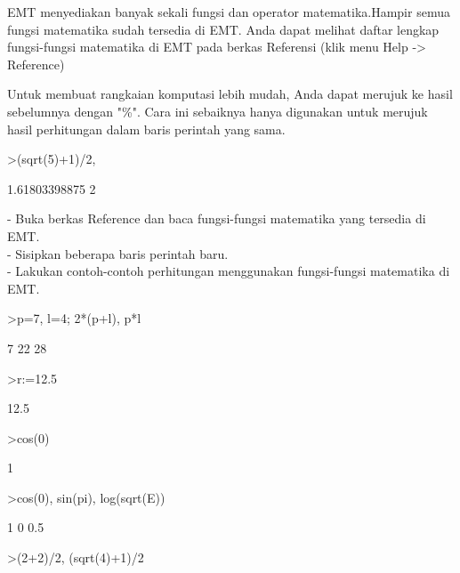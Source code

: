 \documentclass[12pt,arial,letterpaper]{book}
\begin{document}
\begin{eulernootebook}
\begin{eulercomment}
\begin{eulercomment}
\begin{eulercomment}
EMT menyediakan banyak sekali fungsi dan operator matematika.Hampir semua fungsi
matematika sudah tersedia di EMT. Anda dapat melihat daftar lengkap fungsi-fungsi
matematika di EMT pada berkas Referensi (klik menu Help -\textgreater{} Reference)

Untuk membuat rangkaian komputasi lebih mudah, Anda dapat merujuk ke hasil
sebelumnya dengan "\%". Cara ini sebaiknya hanya digunakan untuk merujuk hasil
perhitungan dalam baris perintah yang sama.
\end{eulercomment}
\begin{eulerprompt}
>(sqrt(5)+1)/2, %
\end{eulerprompt}
\begin{euleroutput}
  1.61803398875
  2
\end{euleroutput}
\begin{eulercomment}
- Buka berkas Reference dan baca fungsi-fungsi matematika yang
tersedia di EMT.\\
- Sisipkan beberapa baris perintah baru.\\
- Lakukan contoh-contoh perhitungan menggunakan fungsi-fungsi
matematika di EMT.\\
\end{eulercomment}
\eulersubheading{}
\begin{eulerprompt}
>p=7, l=4; 2*(p+l), p*l
\end{eulerprompt}
\begin{euleroutput}
  7
  22
  28
\end{euleroutput}
\begin{eulerprompt}
>r:=12.5
\end{eulerprompt}
\begin{euleroutput}
  12.5
\end{euleroutput}
\begin{eulerprompt}
>cos(0)
\end{eulerprompt}
\begin{euleroutput}
  1
\end{euleroutput}
\begin{eulerprompt}
>cos(0), sin(pi), log(sqrt(E))
\end{eulerprompt}
\begin{euleroutput}
  1
  0
  0.5
\end{euleroutput}
\begin{eulerprompt}
>(2+2)/2, (sqrt(4)+1)/2
\end{eulerprompt}
\begin{euleroutput}

\end{euleroutput}
\end{eulercomment}
\end{eulercomment}
\end{eulernootebook}
\end{document}
